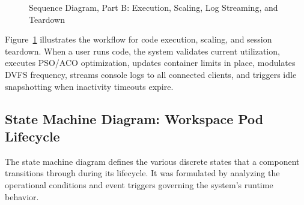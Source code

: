 \documentclass[12pt,a4paper]{report}
\newcommand{\sq}[5]{%
	\pgfmathsetmacro{\sqW}{max(abs(#2-#3)-0.5,1.5)}
	\draw[#1] (#2,#4) -- (#3,#4);
	\node[font=\footnotesize, text width=\sqW cm, align=center, anchor=south, inner sep=1.5pt]
	at ({(#2+#3)/2},#4) {#5};}
\newcommand{\sql}[6]{%
	\draw[#1] (#2,#4) -- (#3,#4);
	\node[font=\footnotesize, fill=white, anchor=south, inner sep=1.5pt, yshift=1pt]
	at ({#2+(#3-#2)*#6},#4) {#5};}
\newcommand{\selfm}[4]{%
	\draw[thick,black,->] (#1+0.1,#2) -- (#1+0.75,#2) -- (#1+0.75,#2-0.5) -- (#1+0.1,#2-0.5);
	\node[anchor=west,font=\footnotesize,text width=#4 cm,align=left,inner sep=1.5pt]
	at (#1+0.8,#2-0.25) {#3};}
\begin{document}
\begin{figure}[H]
{}
		\caption{Sequence Diagram, Part B: Execution, Scaling, Log Streaming, and Teardown}
		\label{fig:seq_b}
	\end{figure}
	
	Figure~\ref{fig:seq_b} illustrates the workflow for code execution, scaling, and session teardown. When a user runs code, the system validates current utilization, executes PSO/ACO optimization, updates container limits in place, modulates DVFS frequency, streams console logs to all connected clients, and triggers idle snapshotting when inactivity timeouts expire.
	
	\clearpage
	\subsection{State Machine Diagram: Workspace Pod Lifecycle}
	
	The state machine diagram defines the various discrete states that a component transitions through during its lifecycle. It was formulated by analyzing the operational conditions and event triggers governing the system's runtime behavior.
	
\end{document}
